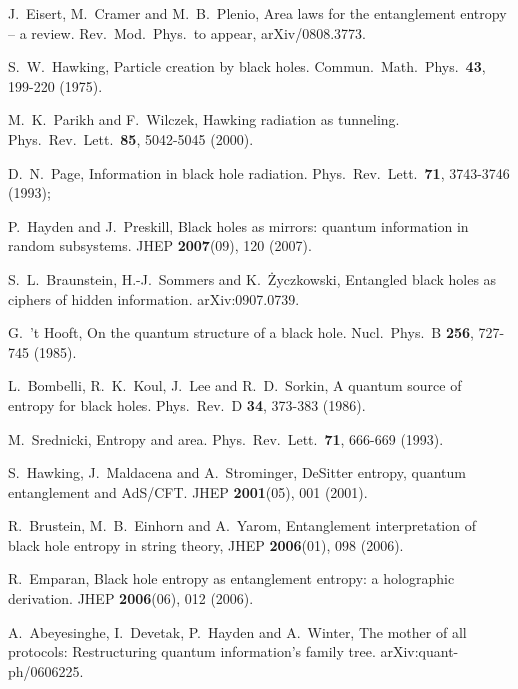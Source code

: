 \documentclass[twocolumn,aps,prl]{revtex4}
\begin{document}
\begin{thebibliography}{99}

 J.\ Eisert, M.\ Cramer and M.\ B.\ Plenio,
Area laws for the entanglement entropy -- a review.
Rev.\ Mod.\ Phys.\ to appear, arXiv/0808.3773.

 S.\ W.\ Hawking,
Particle creation by black holes.
Commun.\ Math.\ Phys.\ {\bf 43}, 199-220 (1975).

 M.\ K.\ Parikh and F.\ Wilczek,
Hawking radiation as tunneling.
Phys.\ Rev.\ Lett.\ {\bf 85}, 5042-5045 (2000).

 D.\ N.\ Page,
Information in black hole radiation.
Phys.\ Rev.\ Lett.\ {\bf 71}, 3743-3746 (1993);

 P.\ Hayden and J.\ Preskill,
Black holes as mirrors: quantum information in random subsystems.
JHEP {\bf 2007}(09), 120 (2007).

 S.\ L.\ Braunstein, H.-J.\ Sommers and K.\ \.{Z}yczkowski,
Entangled black holes as ciphers of hidden information.
arXiv:0907.0739.

 G.\ 't Hooft,
On the quantum structure of a black hole.
Nucl.\ Phys.\ B {\bf 256}, 727-745 (1985).

 L.\ Bombelli, R.\ K.\ Koul, J.\ Lee and R.\ D.\ Sorkin,
A quantum source of entropy for black holes.
Phys.\ Rev.\ D {\bf 34}, 373-383 (1986).

 M.\ Srednicki,
Entropy and area.
Phys.\ Rev.\ Lett.\ {\bf 71}, 666-669 (1993).

 S.\ Hawking, J.\ Maldacena and A.\ Strominger,
DeSitter entropy, quantum entanglement and AdS/CFT.
JHEP {\bf 2001}(05), 001 (2001).

 R.\ Brustein, M.\ B.\ Einhorn and A.\ Yarom,
Entanglement interpretation of black hole entropy in string theory,
JHEP {\bf 2006}(01), 098 (2006).

 R.\ Emparan,
Black hole entropy as entanglement entropy: a holographic derivation.
JHEP {\bf 2006}(06), 012 (2006).

 A.\ Abeyesinghe, I.\ Devetak, P.\ Hayden and A.\ Winter,
The mother of all protocols: Restructuring quantum information's family
tree.
arXiv:quant-ph/0606225.

\end{thebibliography}
\end{document}
